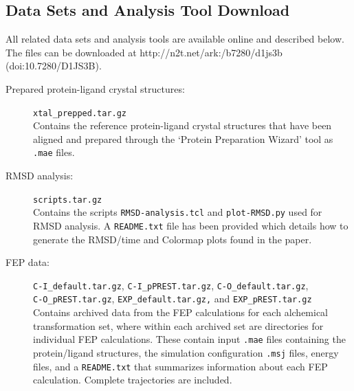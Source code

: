 \documentclass[journal=jctcce,manuscript=article]{achemso}
\begin{document}
\begin{suppinfo}


\section*{Data Sets and Analysis Tool Download}
All related data sets and analysis tools are available online and described below.
The files can be downloaded at http://n2t.net/ark:/b7280/d1js3b (doi:10.7280/D1JS3B). 
\begin{description}
\item [Prepared protein-ligand crystal structures:]\texttt{xtal\_prepped.tar.gz}\\
Contains the reference protein-ligand crystal structures that have been aligned and prepared through the `Protein Preparation Wizard' tool as \texttt{.mae} files.
\item [RMSD analysis:]\texttt{scripts.tar.gz}\\
Contains the scripts \texttt{RMSD-analysis.tcl} and \texttt{plot-RMSD.py} used for RMSD analysis. A \texttt{README.txt} file has been provided which details how to generate the RMSD/time and Colormap plots found in the paper. 
\item [FEP data:]\texttt{C-I\_default.tar.gz}, \texttt{C-I\_pPREST.tar.gz}, \texttt{C-O\_default.tar.gz}, \\ \texttt{C-O\_pREST.tar.gz}, \texttt{EXP\_default.tar.gz,} and \texttt{EXP\_pREST.tar.gz}\\
Contains archived data from the FEP calculations for each alchemical transformation set, where within each archived set are directories for individual FEP calculations. These contain input \texttt{.mae} files containing the protein/ligand structures, the simulation configuration \texttt{.msj} files, energy files, and a \texttt{README.txt} that summarizes information about each FEP calculation. Complete trajectories are included.
\end{description}



\end{suppinfo}

\clearpage

\end{document}
